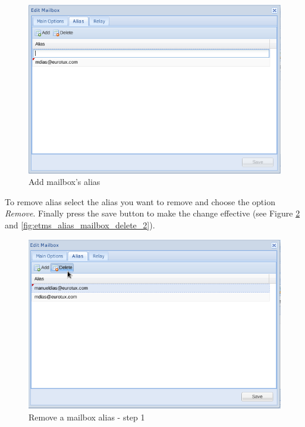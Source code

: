 \begin{figure}[H]
    \begin{center}
    \includegraphics[scale=0.45]{screenshots/etms/etms_alias_create.png}
    \caption{Add mailbox's alias}
    \label{fig:etms_alias_create}
    \end{center}
\end{figure}

To remove alias select the alias you want to remove and choose the option \textit{Remove}. Finally press the save button to make the change effective (see Figure \ref{fig:etms_alias_mailbox_delete} and \ref{fig:etms_alias_mailbox_delete_2}).

\begin{figure}[H]
    \begin{center}
    \includegraphics[scale=0.6]{screenshots/etms/etms_alias_mailbox_delete.png}
    \caption{Remove a mailbox alias - step 1}
    \label{fig:etms_alias_mailbox_delete}
    \end{center}
\end{figure}

